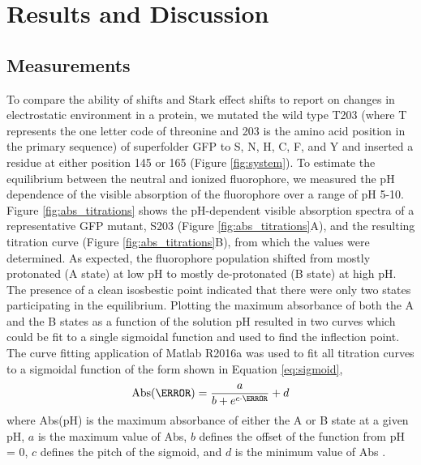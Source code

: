 \section{Results and Discussion} \label{pKa-results}

\subsection{\pKa{} Measurements}

To compare the ability of \pKa{} shifts and Stark effect shifts to report on changes in electrostatic environment in a protein, we mutated the wild type T203 (where T represents the one letter code of threonine and 203 is the amino acid position in the primary sequence) of superfolder GFP to S, N, H, C, F, and Y and inserted a \pCNF{} residue at either position 145 or 165 (Figure \ref{fig:system}). 
To estimate the equilibrium between the neutral and ionized fluorophore, we measured the pH dependence of the visible absorption of the fluorophore over a range of pH 5-10.  
Figure \ref{fig:abs_titrations} shows the pH-dependent visible absorption spectra of a representative GFP mutant, S203 (Figure \ref{fig:abs_titrations}A), and the resulting titration curve (Figure \ref{fig:abs_titrations}B), from which the \pKa{} values were determined. 
As expected, the fluorophore population shifted from mostly protonated (A state) at low pH to mostly de-protonated (B state) at high pH.
The presence of a clean isosbestic point indicated that there were only two states participating in the equilibrium.
Plotting the maximum absorbance of both the A and the B states as a function of the solution pH resulted in two curves which could be fit to a single sigmoidal function and used to find the inflection point.
The curve fitting application of Matlab R2016a was used to fit all titration curves to a sigmoidal function of the form shown in Equation \ref{eq:sigmoid},
\begin{equation}
    \text{Abs}(\pH) = \frac{a}{b+e^{c\cdot\pH}}+d
    \label{eq:sigmoid}
\end{equation}
where Abs(pH) is the maximum absorbance of either the A or B state at a given pH, $a$ is the maximum value of Abs, $b$ defines the offset of the function from pH = 0, $c$ defines the pitch of the sigmoid, and $d$ is the minimum value of Abs \cite{Matlab2016}.
